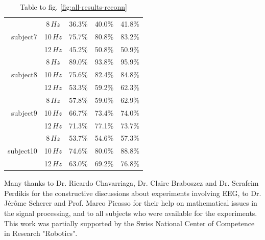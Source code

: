 \documentclass[smallextended]{svjour3}
\begin{document}
\begin{table}
\begin{center}
\begin{tabular}{ r | c | c | c | c }
        \hline

        \multirow{3}{*}{subject7} &  8\,$Hz$ & 36.3\% & 40.0\% & 41.8\% \\
                                  & 10\,$Hz$ & 75.7\% & 80.8\% & 83.2\% \\
                                  & 12\,$Hz$ & 45.2\% & 50.8\% & 50.9\% \\

        \hline

        \multirow{3}{*}{subject8} &  8\,$Hz$ & 89.0\% & 93.8\% & 95.9\% \\
                                  & 10\,$Hz$ & 75.6\% & 82.4\% & 84.8\% \\
                                  & 12\,$Hz$ & 53.3\% & 59.2\% & 62.3\% \\

        \hline

        \multirow{3}{*}{subject9} &  8\,$Hz$ & 57.8\% & 59.0\% & 62.9\% \\
                                  & 10\,$Hz$ & 66.7\% & 73.4\% & 74.0\% \\
                                  & 12\,$Hz$ & 71.3\% & 77.1\% & 73.7\% \\

        \hline

        \multirow{3}{*}{subject10} &  8\,$Hz$ & 53.7\% & 54.6\% & 57.3\% \\
                                  & 10\,$Hz$ & 74.6\% & 80.0\% & 88.8\% \\
                                  & 12\,$Hz$ & 63.0\% & 69.2\% & 76.8\% \\

    \end{tabular}
    \caption{Table to fig. \ref{fig:all-results-reconn}}
\end{center}\end{table}

\fi


\begin{acknowledgement}
Many thanks to Dr. Ricardo Chavarriaga, Dr. Claire Braboszcz and Dr. Serafeim Perdikis for the constructive discussions about experiments involving EEG, to Dr. J\'er\^ome Scherer and Prof. Marco Picasso for their help on mathematical issues in the signal processing, and to all subjects who were available for the experiments. This work was partially supported by the Swiss National Center of Competence in Research "Robotics".
\end{acknowledgement}


\end{document}
